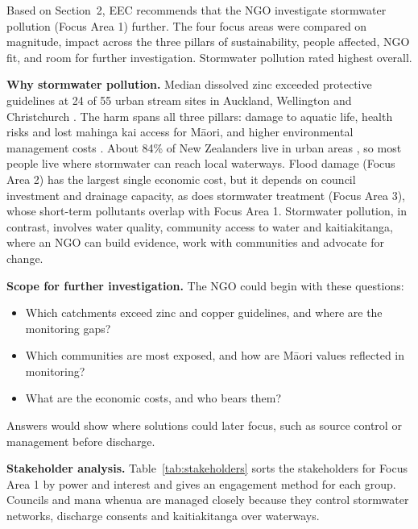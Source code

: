 \documentclass[11pt,a4paper]{article}
\begin{document}
Based on Section~2, EEC recommends that the NGO investigate stormwater pollution (Focus Area 1) further. The four focus areas were compared on magnitude, impact across the three pillars of sustainability, people affected, NGO fit, and room for further investigation. Stormwater pollution rated highest overall.

\textbf{Why stormwater pollution.} Median dissolved zinc exceeded protective guidelines at 24 of 55 urban stream sites in Auckland, Wellington and Christchurch \citep{niwa2021}. The harm spans all three pillars: damage to aquatic life, health risks and lost mahinga kai access for M\=aori, and higher environmental management costs \citep{mfe_stats2025_env,mfe_stats2026}. About 84\% of New Zealanders live in urban areas \citep{ehinz}, so most people live where stormwater can reach local waterways. Flood damage (Focus Area 2) has the largest single economic cost, but it depends on council investment and drainage capacity, as does stormwater treatment (Focus Area 3), whose short-term pollutants overlap with Focus Area 1. Stormwater pollution, in contrast, involves water quality, community access to water and kaitiakitanga, where an NGO can build evidence, work with communities and advocate for change.

\textbf{Scope for further investigation.} The NGO could begin with these questions:
\begin{itemize}
  \item Which catchments exceed zinc and copper guidelines, and where are the monitoring gaps?
  \item Which communities are most exposed, and how are M\=aori values reflected in monitoring?
  \item What are the economic costs, and who bears them?
\end{itemize}
Answers would show where solutions could later focus, such as source control or management before discharge.

\textbf{Stakeholder analysis.} Table~\ref{tab:stakeholders} sorts the stakeholders for Focus Area 1 by power and interest and gives an engagement method for each group. Councils and mana whenua are managed closely because they control stormwater networks, discharge consents and kaitiakitanga over waterways.
\end{document}
